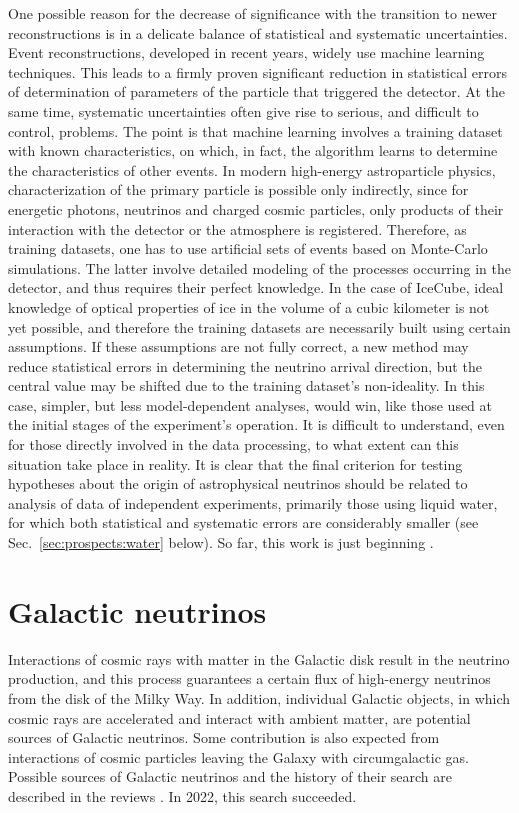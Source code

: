 \documentclass[a4paper,noshowpacs,noshowkeys,floatfix,twocolumn,preprintnumbers,nofootinbib]{revtex4-2}
\begin{document}
One possible reason for the decrease of significance with the transition to newer reconstructions is in a delicate balance of statistical and systematic uncertainties. Event reconstructions, developed in recent years, widely use machine learning techniques. This leads to a firmly proven significant reduction in statistical errors of determination of parameters of the particle that triggered the detector. At the same time, systematic uncertainties often give rise to serious, and difficult to control, problems. The point is that machine learning involves a training dataset with known characteristics, on which, in fact, the algorithm learns to determine the characteristics of other events. In modern high-energy astroparticle physics, characterization of the primary particle is possible only indirectly, since for energetic photons, neutrinos and charged cosmic particles, only products of their interaction with the detector or the atmosphere is registered. Therefore, as training datasets, one has to use artificial sets of events based on Monte-Carlo simulations. The latter involve detailed modeling of the processes occurring in the detector, and thus requires their perfect knowledge. In the case of IceCube, ideal knowledge of optical properties of ice in the volume of a cubic kilometer is not yet possible, and therefore the training datasets are necessarily built using certain assumptions. If these assumptions are not fully correct, a new method may reduce statistical errors in determining the neutrino arrival direction, but the central value may be shifted due to the training dataset's non-ideality. In this case, simpler, but less model-dependent analyses, would win, like those used at the initial stages of the experiment's operation. It is difficult to understand, even for those directly involved in the data processing, to what extent can this situation take place in reality. It is clear that the final criterion for testing hypotheses about the origin of astrophysical neutrinos should be related to analysis of data of independent experiments, primarily those using liquid water, for which both statistical and systematic errors are considerably smaller \cite{ST-UFN} (see Sec.~\ref{sec:prospects:water} below). So far, this work is just beginning \cite{Baikal-0506, ANTARES-blazars,Baikal-Nikita}.

\section{Galactic neutrinos}
\label{sec:gal}
Interactions of cosmic rays with matter in the Galactic disk result in the neutrino production, and this process guarantees a certain flux of high-energy neutrinos from the disk of the Milky Way. In addition, individual Galactic objects, in which cosmic rays are accelerated and interact with ambient matter, are potential sources of Galactic neutrinos. Some contribution is also expected from interactions of cosmic particles leaving the Galaxy with circumgalactic gas. Possible sources of Galactic neutrinos and the history of their search are described in the reviews \cite{ST-UFN, Kheirandish:gal}. In 2022, this search succeeded. 
\end{document}
